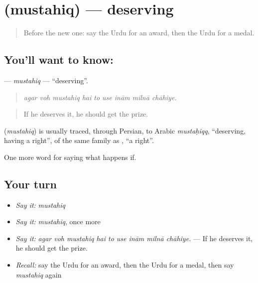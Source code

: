 \section[\texorpdfstring{\ur{مستحق} (mustahiq)}{مستحق (mustahiq)}]{ (mustahiq) — deserving}

\label{lesson:UR-C382-mustahiq}



\begin{quote}
Before the new one: say the Urdu for an award, then the Urdu for a medal.
\end{quote}

\subsection*{You'll want to know: }
\textbf{} — \emph{mustahiq} — \textquotedblleft{}deserving\textquotedblright{}.

\begin{quote}
        
\end{quote}

\begin{quote}
\emph{agar voh mustahiq hai to use inām milnā chāhiye.}
\end{quote}

\begin{quote}
If he deserves it, he should get the prize.
\end{quote}

\begin{cousinweb}
\textbf{} (\emph{mustahiq}) is usually traced, through Persian, to Arabic \emph{mustaḥiqq}, \textquotedblleft{}deserving, having a right\textquotedblright{}, of the same family as \textbf{}, \textquotedblleft{}a right\textquotedblright{}.
\end{cousinweb}

\begin{grammarlens}[title={What you've built}]
One more word for saying what happens if.
\end{grammarlens}

\subsection*{Your turn}
\begin{itemize}
\raggedright
  \item \emph{Say it:} \emph{mustahiq}
  \item \emph{Say it:} \emph{mustahiq}, once more
  \item \emph{Say it:} \emph{agar voh mustahiq hai to use inām milnā chāhiye.} — If he deserves it, he should get the prize.
  \item \emph{Recall:} say the Urdu for an award, then the Urdu for a medal, then say \emph{mustahiq} again
\end{itemize}

